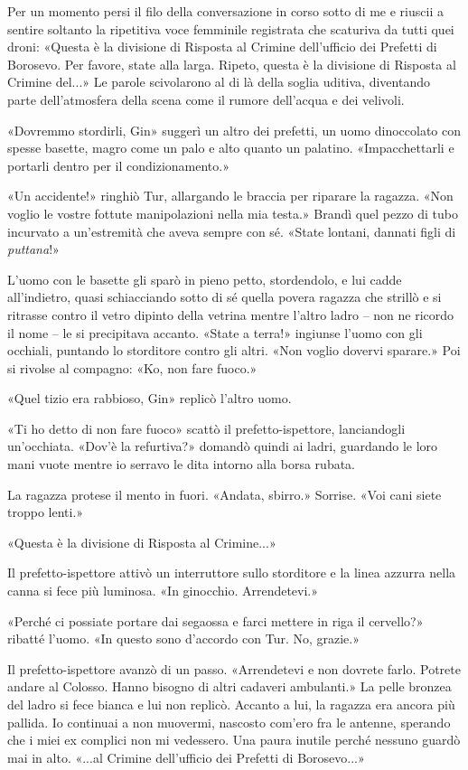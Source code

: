 Per un momento persi il filo della conversazione in corso sotto di me e
riuscii a sentire soltanto la ripetitiva voce femminile registrata che
scaturiva da tutti quei droni: «Questa è la divisione di Risposta al
Crimine dell'ufficio dei Prefetti di Borosevo. Per favore, state alla
larga. Ripeto, questa è la divisione di Risposta al Crimine del...» Le
parole scivolarono al di là della soglia uditiva, diventando parte
dell'atmosfera della scena come il rumore dell'acqua e dei velivoli.

«Dovremmo stordirli, Gin» suggerì un altro dei prefetti, un uomo
dinoccolato con spesse basette, magro come un palo e alto quanto un
palatino. «Impacchettarli e portarli dentro per il condizionamento.»

«Un accidente!» ringhiò Tur, allargando le braccia per riparare la
ragazza. «Non voglio le vostre fottute manipolazioni nella mia testa.»
Brandì quel pezzo di tubo incurvato a un'estremità che aveva sempre con
sé. «State lontani, dannati figli di \emph{puttana}!»

L'uomo con le basette gli sparò in pieno petto, stordendolo, e lui cadde
all'indietro, quasi schiacciando sotto di sé quella povera ragazza che
strillò e si ritrasse contro il vetro dipinto della vetrina mentre
l'altro ladro -- non ne ricordo il nome -- le si precipitava accanto.
«State a terra!» ingiunse l'uomo con gli occhiali, puntando lo
storditore contro gli altri. «Non voglio dovervi sparare.» Poi si
rivolse al compagno: «Ko, non fare fuoco.»

«Quel tizio era rabbioso, Gin» replicò l'altro uomo.

«Ti ho detto di non fare fuoco» scattò il prefetto-ispettore,
lanciandogli un'occhiata. «Dov'è la refurtiva?» domandò quindi ai ladri,
guardando le loro mani vuote mentre io serravo le dita intorno alla
borsa rubata.

La ragazza protese il mento in fuori. «Andata, sbirro.» Sorrise. «Voi
cani siete troppo lenti.»

«Questa è la divisione di Risposta al Crimine...»

Il prefetto-ispettore attivò un interruttore sullo storditore e la linea
azzurra nella canna si fece più luminosa. «In ginocchio. Arrendetevi.»

«Perché ci possiate portare dai segaossa e farci mettere in riga il
cervello?» ribatté l'uomo. «In questo sono d'accordo con Tur. No,
grazie.»

Il prefetto-ispettore avanzò di un passo. «Arrendetevi e non dovrete
farlo. Potrete andare al Colosso. Hanno bisogno di altri cadaveri
ambulanti.» La pelle bronzea del ladro si fece bianca e lui non replicò.
Accanto a lui, la ragazza era ancora più pallida. Io continuai a non
muovermi, nascosto com'ero fra le antenne, sperando che i miei ex
complici non mi vedessero. Una paura inutile perché nessuno guardò mai
in alto. «...al Crimine dell'ufficio dei Prefetti di Borosevo...»

